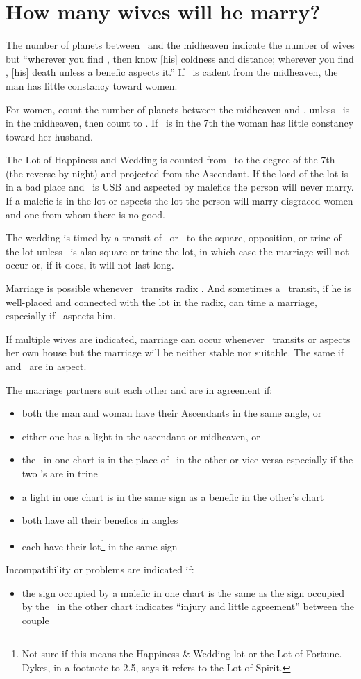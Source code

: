 \section{How many wives will he marry?}

The number of planets between \Venus\, and the midheaven indicate the number of wives but ``wherever you find \Saturn, then know [his] coldness and distance; wherever you find \Mars, [his] death unless a benefic aspects it.'' If \Venus\, is cadent from the midheaven, the man has little constancy toward women.

For women, count the number of planets between the midheaven and \Mars, unless \Mars\, is in the midheaven, then count to \Jupiter.  If \Mars\, is in the 7th the woman has little constancy toward her husband.

The Lot of Happiness and Wedding is counted from \Venus\, to the degree of the 7th (the reverse by night) and projected from the Ascendant.  If the lord of the lot is in a bad place and \Venus\, is USB and aspected by malefics the person will never marry. If a malefic is in the lot or aspects the lot the person will marry disgraced women and one from whom there is no good.

The wedding is timed by a transit of \Jupiter\, or \Venus\, to the square, opposition, or trine of the lot unless \Saturn\, is also square or trine the lot, in which case the marriage will not occur or, if it does, it will not last long.

Marriage is possible whenever \Jupiter\, transits radix \Venus. And sometimes a \Saturn\, transit, if he is well-placed and connected with the lot in the radix, can time a marriage, especially if \Jupiter\, aspects him.

If multiple wives are indicated, marriage can occur whenever \Venus\, transits or aspects her own house but the marriage will be neither stable nor suitable. The same if \Venus\, and \Mars\, are in aspect.

The marriage partners suit each other and are in agreement if:
\begin{itemize}[topsep=0em,itemsep=0em]
\item both the man and woman have their Ascendants in the same angle, or 
\item either one has a light in the ascendant or midheaven, or 
\item the \Moon\, in one chart is in the place of \Venus\, in the other or vice versa especially if the two \Moon's are in trine
\item a light in one chart is in the same sign as a benefic in the other's chart
\item both have all their benefics in angles
\item each have their lot\footnote{Not sure if this means the Happiness \& Wedding lot or the Lot of Fortune. Dykes, in a footnote to 2.5, says it refers to the Lot of Spirit.} in the same sign
\end{itemize}

Incompatibility or problems are indicated if:
\begin{itemize}[topsep=0em,itemsep=0em]
\item the sign occupied by a malefic in one chart is the same as the sign occupied by the \Moon\, in the other chart indicates ``injury and little agreement'' between the couple
\end{itemize}
